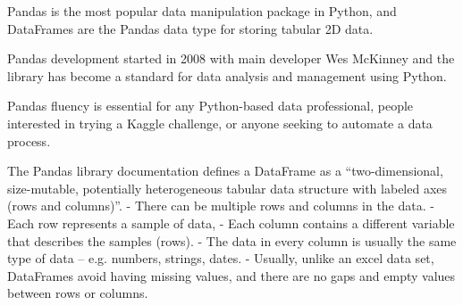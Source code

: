 \documentclass[11pt]{article}
\providecommand{\tightlist}{%
      \setlength{\itemsep}{0pt}\setlength{\parskip}{0pt}}
\begin{document}
\begin{description}
\tightlist
\item[What is "Pandas DataFrame"?]
Pandas is the most popular data manipulation package in Python, and
DataFrames are the Pandas data type for storing tabular 2D data.

Pandas development started in 2008 with main developer Wes McKinney and
the library has become a standard for data analysis and management using
Python.

Pandas fluency is essential for any Python-based data professional,
people interested in trying a Kaggle challenge, or anyone seeking to
automate a data process.

The Pandas library documentation defines a DataFrame as a
``two-dimensional, size-mutable, potentially heterogeneous tabular data
structure with labeled axes (rows and columns)''. - There can be
multiple rows and columns in the data. - Each row represents a sample of
data, - Each column contains a different variable that describes the
samples (rows). - The data in every column is usually the same type of
data -- e.g. numbers, strings, dates. - Usually, unlike an excel data
set, DataFrames avoid having missing values, and there are no gaps and
empty values between rows or columns.
\end{description}
\end{document}
